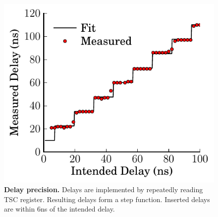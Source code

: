 \begin{figure}
  \centering
  \includegraphics[width=.50\linewidth]{OLTP_eval/Delay.pdf}
  \caption{\textbf{Delay precision.} Delays are implemented by repeatedly reading TSC register.  Resulting delays form a step function.  Inserted delays are within 6ns of the intended delay.}
  \label{fig::Delay}
\end{figure}
